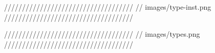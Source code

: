 

////////////////////////////////////
// images/type-inst.png 
////////////////////////////////////

////////////////////////////////////
// images/types.png 
////////////////////////////////////

